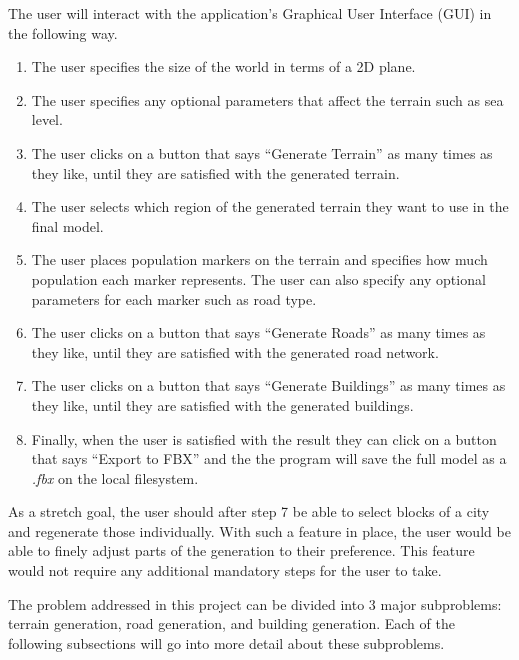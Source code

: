 The user will interact with the application's Graphical User Interface (GUI) in the following way.
\begin{enumerate}
  \item The user specifies the size of the world in terms of a 2D plane.
  \item The user specifies any optional parameters that affect the terrain
    such as sea level.
  \item The user clicks on a button that says ``Generate Terrain'' as many times
    as they like, until they are satisfied with the generated terrain.
  \item The user selects which region of the generated terrain they want to use in the final model.
  \item The user places population markers on the terrain and specifies how much
    population each marker represents. The user can also specify any optional
    parameters for each marker such as road type.
  \item The user clicks on a button that says ``Generate Roads'' as many times
    as they like, until they are satisfied with the generated road network.
  \item The user clicks on a button that says ``Generate Buildings'' as many times
    as they like, until they are satisfied with the generated buildings.
  \item Finally, when the user is satisfied with the result they can click on a
    button that says ``Export to FBX'' and the the program will save the full
    model as a \textit{.fbx} on the local filesystem.
\end{enumerate}

As a stretch goal, the user should after step 7 be able to select blocks of a
city and regenerate those individually. With such a feature in place, the user
would be able to finely adjust parts of the generation to their preference. This
feature would not require any additional mandatory steps for the user to take.

The problem addressed in this project can be divided into 3 major subproblems:
terrain generation, road generation, and building generation.
Each of the following subsections will go into more detail about these
subproblems.





